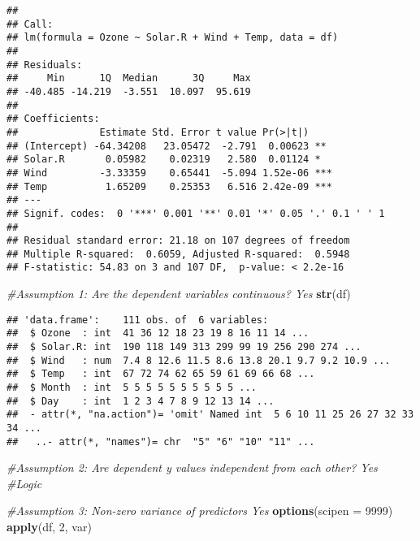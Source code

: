 \documentclass[]{article}
\newenvironment{Shaded}{\begin{snugshade}}{\end{snugshade}}
\newcommand{\CommentTok}[1]{\textcolor[rgb]{0.56,0.35,0.01}{\textit{#1}}}
\newcommand{\DataTypeTok}[1]{\textcolor[rgb]{0.13,0.29,0.53}{#1}}
\newcommand{\DecValTok}[1]{\textcolor[rgb]{0.00,0.00,0.81}{#1}}
\newcommand{\KeywordTok}[1]{\textcolor[rgb]{0.13,0.29,0.53}{\textbf{#1}}}
\newcommand{\NormalTok}[1]{#1}
\begin{document}
\begin{verbatim}
## 
## Call:
## lm(formula = Ozone ~ Solar.R + Wind + Temp, data = df)
## 
## Residuals:
##     Min      1Q  Median      3Q     Max 
## -40.485 -14.219  -3.551  10.097  95.619 
## 
## Coefficients:
##              Estimate Std. Error t value Pr(>|t|)    
## (Intercept) -64.34208   23.05472  -2.791  0.00623 ** 
## Solar.R       0.05982    0.02319   2.580  0.01124 *  
## Wind         -3.33359    0.65441  -5.094 1.52e-06 ***
## Temp          1.65209    0.25353   6.516 2.42e-09 ***
## ---
## Signif. codes:  0 '***' 0.001 '**' 0.01 '*' 0.05 '.' 0.1 ' ' 1
## 
## Residual standard error: 21.18 on 107 degrees of freedom
## Multiple R-squared:  0.6059, Adjusted R-squared:  0.5948 
## F-statistic: 54.83 on 3 and 107 DF,  p-value: < 2.2e-16
\end{verbatim}

\begin{Shaded}
\begin{Highlighting}[]
\CommentTok{#Assumption 1: Are the dependent variables continuous? Yes}
\KeywordTok{str}\NormalTok{(df)}
\end{Highlighting}
\end{Shaded}

\begin{verbatim}
## 'data.frame':    111 obs. of  6 variables:
##  $ Ozone  : int  41 36 12 18 23 19 8 16 11 14 ...
##  $ Solar.R: int  190 118 149 313 299 99 19 256 290 274 ...
##  $ Wind   : num  7.4 8 12.6 11.5 8.6 13.8 20.1 9.7 9.2 10.9 ...
##  $ Temp   : int  67 72 74 62 65 59 61 69 66 68 ...
##  $ Month  : int  5 5 5 5 5 5 5 5 5 5 ...
##  $ Day    : int  1 2 3 4 7 8 9 12 13 14 ...
##  - attr(*, "na.action")= 'omit' Named int  5 6 10 11 25 26 27 32 33 34 ...
##   ..- attr(*, "names")= chr  "5" "6" "10" "11" ...
\end{verbatim}

\begin{Shaded}
\begin{Highlighting}[]
\CommentTok{#Assumption 2: Are dependent y values independent from each other? Yes}
\CommentTok{#Logic}
\end{Highlighting}
\end{Shaded}

\begin{Shaded}
\begin{Highlighting}[]
\CommentTok{#Assumption 3: Non-zero variance of predictors Yes}
\KeywordTok{options}\NormalTok{(}\DataTypeTok{scipen =} \DecValTok{9999}\NormalTok{)}
\KeywordTok{apply}\NormalTok{(df, }\DecValTok{2}\NormalTok{, var)}
\end{Highlighting}
\end{Shaded}
\end{document}
